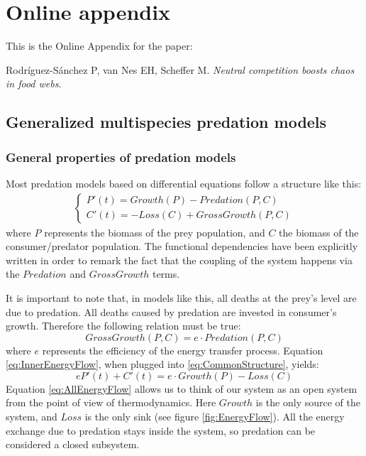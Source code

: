 \appendix
\setcounter{equation}{0}
\setcounter{figure}{0}
\renewcommand{\theequation}{A.\arabic{equation}}
\renewcommand\thefigure{A.\arabic{figure}}

\section{Online appendix}
\label{sec:Appendix}

This is the Online Appendix for the paper:

\begin{center}
Rodríguez-Sánchez P, van Nes EH, Scheffer M. \textit{Neutral competition boosts chaos in food webs}.
\end{center}

\subsection{Generalized multispecies predation models}
\label{subsec:GeneralizedModels}

\subsubsection{General properties of predation models}
\label{subsubsec:GeneralPropertiesOfPredation}

Most predation models based on differential equations follow a structure like this:
%
\begin{eqnarray}
\label{eq:CommonStructure}
	\begin{cases}
	P'(t) = Growth(P) - Predation(P,C)
	\\
	C'(t) = -Loss(C) + GrossGrowth(P,C)
	\end{cases}
\end{eqnarray}
%
where $P$ represents the biomass of the prey population, and $C$ the biomass of the consumer/predator population. The functional dependencies have been explicitly written in order to remark the fact that the coupling of the system happens via the $Predation$ and $GrossGrowth$ terms.

It is important to note that, in models like this, all deaths at the prey's level are due to predation. All deaths caused by predation are invested in consumer's growth. Therefore the following relation must be true:
%
\begin{equation}
\label{eq:InnerEnergyFlow}
	GrossGrowth(P,C) = e \cdot Predation(P,C)
\end{equation}
%
where $e$ represents the efficiency of the energy transfer process. Equation \ref{eq:InnerEnergyFlow}, when plugged into \ref{eq:CommonStructure}, yields:
%
\begin{equation}
\label{eq:AllEnergyFlow}
	e P'(t) + C'(t) = e \cdot Growth(P) - Loss(C)
\end{equation}
%
Equation \ref{eq:AllEnergyFlow} allows us to think of our system as an open system from the point of view of thermodynamics. Here $Growth$ is the only source of the system, and $Loss$ is the only sink (see figure \ref{fig:EnergyFlow}). All the energy exchange due to predation stays inside the system, so predation can be considered a closed subsystem.


